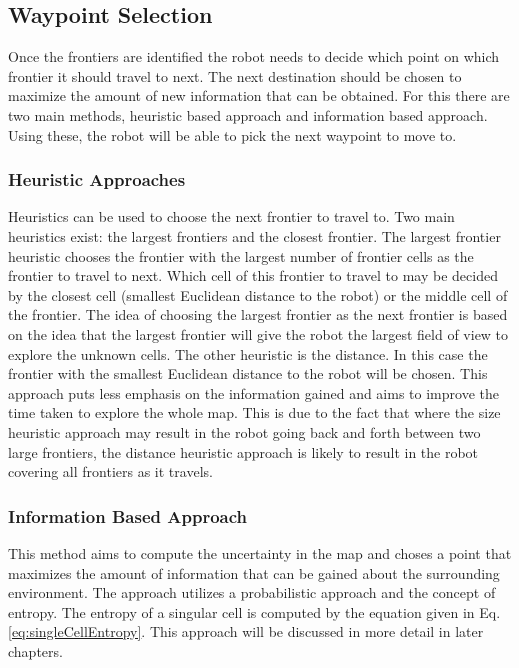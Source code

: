 \documentclass[a4paper,12pt]{article}
\begin{document}
			\subsection{Waypoint Selection}

				Once the frontiers are identified the robot needs to decide which point on which frontier it should travel to next. The next destination should be chosen to maximize the amount of new information that can be obtained. For this there are two main methods, heuristic based approach and information based approach. Using these, the robot will be able to pick the next waypoint to move to. 

				\subsubsection{Heuristic Approaches}

					Heuristics can be used to choose the next frontier to travel to. Two main heuristics exist: the largest frontiers and the closest frontier. The largest frontier heuristic chooses the frontier with the largest number of frontier cells as the frontier to travel to next. Which cell of this frontier to travel to may be decided by the closest cell (smallest Euclidean distance to the robot) or the middle cell of the frontier. The idea of choosing the largest frontier as the next frontier is based on the idea that the largest frontier will give the robot the largest field of view to explore the unknown cells. The other heuristic is the distance. In this case the frontier with the smallest Euclidean distance to the robot will be chosen. This approach puts less emphasis on the information gained and aims to improve the time taken to explore the whole map. This is due to the fact that where the size heuristic approach may result in the robot going back and forth between two large frontiers, the distance heuristic approach is likely to result in the robot covering all frontiers as it travels. 

				\subsubsection{Information Based Approach}

					This method aims to compute the uncertainty in the map and choses a point that maximizes the amount of information that can be gained about the surrounding environment. The approach utilizes a probabilistic approach and the concept of entropy. The entropy of a singular cell is computed by the equation given in Eq. \ref{eq:singleCellEntropy}. This approach will be discussed in more detail in later chapters.
\end{document}
